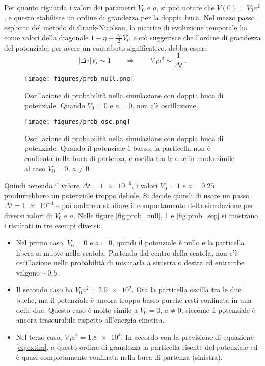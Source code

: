\documentclass[a4paper, titlepage]{article}
\numberwithin{equation}{section}
\begin{document}
Per quanto riguarda i valori dei parametri $V_0$ e $a$, si può notare che $V(0) = V_0 a^2$, e questo stabilisce un ordine di grandezza per la doppia buca. Nel mezzo passo esplicito del metodo di Crank-Nicolson, la matrice di evoluzione temporale ha come valori della diagonale $1-\eta + \frac{\Delta\tau}{2} V_i$, e ciò suggerisce che l'ordine di grandezza del potenziale, per avere un contributo significativo, debba essere
\begin{equation}
    |\Delta\tau| V_i \sim 1 
    \qquad \Rightarrow \qquad
    V_0 a^2 \sim \frac{1}{\Delta t}\, .
    \label{eq:extim}
\end{equation}
\begin{figure}[h!]
    \centering
    \begin{minipage}[t]{0.47 \textwidth}
        \centering
        \texttt{[image: figures/prob\_null.png]}
        \caption{Oscillazione di probabilità nella simulazione con doppia buca di potenziale. Quando $V_0 = 0$ e $a = 0$, non c'è oscillazione.}
        \label{fig:prob_null}
    \end{minipage}
    \hspace{0.02\textwidth}
    \begin{minipage}[t]{0.47 \textwidth}
        \centering
        \texttt{[image: figures/prob\_osc.png]}
        \caption{Oscillazione di probabilità nella simulazione con doppia buca di potenziale. Quando il potenziale è basso, la particella non è confinata nella buca di partenza, e oscilla tra le due in modo simile al caso $V_0 = 0$, $a \neq 0$.}
        \label{fig:prob_osc}
    \end{minipage}
\end{figure}
Quindi tenendo il valore $\Delta t = \num{1e-6}$, i valori $V_0 = 1$ e $a = 0.25$ produrrebbero un potenziale troppo debole. Si decide quindi di usare un passo $\Delta t = \num{1e-4}$ e poi andare a studiare il comportamento della simulazione per diversi valori di $V_0$ e $a$.
Nelle figure \ref{fig:prob_null}, \ref{fig:prob_osc} e \ref{fig:prob_sep} si mostrano i risultati in tre esempi diversi:
\begin{itemize}
    \item Nel primo caso, $V_0 = 0$ e $a = 0$, quindi il potenziale è nullo e la particella libera si muove nella scatola. Partendo dal centro della scatola, non c'è oscillazione nella probabilità di misurarla a sinistra o destra ed entrambe valgono $\sim 0.5$.
    \item Il secondo caso ha $V_0 a^2 = \num{2.5e2}$. Ora la particella oscilla tra le due buche, ma il potenziale è ancora troppo basso purché resti confinata in una delle due. Questo caso è molto simile a $V_0 = 0$, $a \neq 0$, siccome il potenziale è ancora trascurabile rispetto all'energia cinetica.
    \item Nel terzo caso, $V_0 a^2 = \num{1.8e4}$. In accordo con la previsione di equazione \eqref{eq:extim}, a questo ordine di grandezza la particella risente del potenziale ed è quasi completamente confinata nella buca di partenza (sinistra).
\end{itemize}
\end{document}
